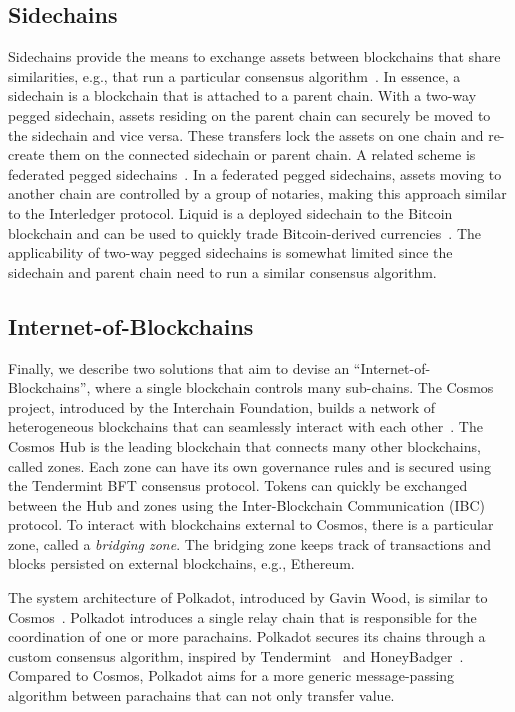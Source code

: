 \subsection{Sidechains}
Sidechains provide the means to exchange assets between blockchains that share similarities, e.g., that run a particular consensus algorithm~\cite{back2014enabling}.
In essence, a sidechain is a blockchain that is attached to a parent chain.
With a two-way pegged sidechain, assets residing on the parent chain can securely be moved to the sidechain and vice versa.
These transfers lock the assets on one chain and re-create them on the connected sidechain or parent chain.
A related scheme is federated pegged sidechains~\cite{dilley2016strong}.
In a federated pegged sidechains, assets moving to another chain are controlled by a group of notaries, making this approach similar to the Interledger protocol.
Liquid is a deployed sidechain to the Bitcoin blockchain and can be used to quickly trade Bitcoin-derived currencies~\cite{dilley2016strong}.
The applicability of two-way pegged sidechains is somewhat limited since the sidechain and parent chain need to run a similar consensus algorithm.

\subsection{Internet-of-Blockchains}
Finally, we describe two solutions that aim to devise an \enquote{Internet-of-Blockchains}, where a single blockchain controls many sub-chains.
The Cosmos project, introduced by the Interchain Foundation, builds a network of heterogeneous blockchains that can seamlessly interact with each other~\cite{cosmoswhitepaper}.
The Cosmos Hub is the leading blockchain that connects many other blockchains, called zones.
Each zone can have its own governance rules and is secured using the Tendermint BFT consensus protocol.
Tokens can quickly be exchanged between the Hub and zones using the Inter-Blockchain Communication (IBC) protocol.
To interact with blockchains external to Cosmos, there is a particular zone, called a \emph{bridging zone}.
The bridging zone keeps track of transactions and blocks persisted on external blockchains, e.g., Ethereum.

The system architecture of Polkadot, introduced by Gavin Wood, is similar to Cosmos~\cite{wood2016polkadot}.
Polkadot introduces a single relay chain that is responsible for the coordination of one or more parachains.
Polkadot secures its chains through a custom consensus algorithm, inspired by Tendermint~\cite{kwon2014tendermint} and HoneyBadger~\cite{miller2016honey}.
Compared to Cosmos, Polkadot aims for a more generic message-passing algorithm between parachains that can not only transfer value.

